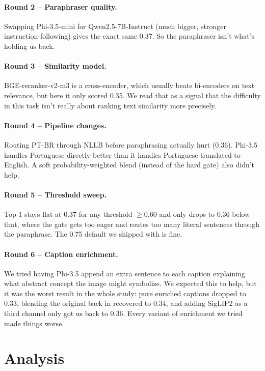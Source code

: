 \documentclass[11pt]{article}
\begin{document}
\paragraph{Round 2 -- Paraphraser quality.}
Swapping Phi-3.5-mini for Qwen2.5-7B-Instruct (much bigger, stronger
instruction-following) gives the exact same 0.37. So the paraphraser isn't
what's holding us back.

\paragraph{Round 3 -- Similarity model.}
BGE-reranker-v2-m3 \cite{bge_reranker} is a cross-encoder, which usually beats bi-encoders on
text relevance, but here it only scored 0.35. We read that as a signal that
the difficulty in this task isn't really about ranking text similarity more
precisely.

\paragraph{Round 4 -- Pipeline changes.}
Routing PT-BR through NLLB before paraphrasing actually hurt (0.36). Phi-3.5
handles Portuguese directly better than it handles Portuguese-translated-to-
English. A soft probability-weighted blend (instead of the hard gate) also
didn't help.

\paragraph{Round 5 -- Threshold sweep.}
Top-1 stays flat at 0.37 for any threshold $\geq 0.60$ and only drops to 0.36
below that, where the gate gets too eager and routes too many literal
sentences through the paraphrase. The 0.75 default we shipped with is fine.

\paragraph{Round 6 -- Caption enrichment.}
We tried having Phi-3.5 append an extra sentence to each caption explaining
what abstract concept the image might symbolize. We expected this to help,
but it was the worst result in the whole study: pure enriched captions
dropped to 0.33, blending the original back in recovered to 0.34, and adding
SigLIP2 as a third channel only got us back to 0.36. Every variant of
enrichment we tried made things worse.

\section{Analysis}
\end{document}
